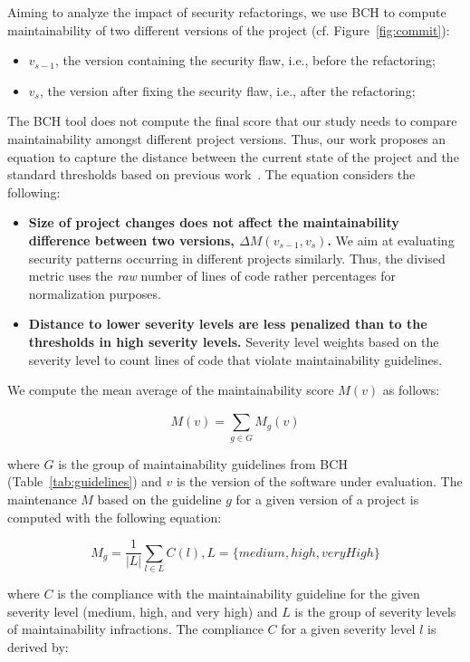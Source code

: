 \documentclass[10pt,conference]{IEEEtran}
\begin{document}
Aiming to analyze the impact of security refactorings, we use BCH to compute
maintainability of two different versions of the project (cf. Figure~\ref{fig:commit}):
\begin{itemize}
	\item $v_{s-1}$, the version containing the security flaw, i.e., before the
	refactoring;
	\item $v_{s}$, the version after fixing the security flaw, i.e., after the
	refactoring;
\end{itemize}

The BCH tool does not compute the final score that our study needs to compare
maintainability amongst different project versions. Thus, our work proposes an
equation to capture the distance between the current state of the project and
the standard thresholds based on previous work~\cite{Olivari:2018}. The equation
considers the following:
\begin{itemize}
	\item \textbf{Size of project changes does not affect the maintainability
	difference between two versions, $\Delta M (v_{s-1},v_{s})$.} We
	aim at evaluating security patterns occurring in different projects similarly.
	Thus, the divised metric uses the \textit{raw} number of lines of code rather
  percentages for normalization purposes.
	\item \textbf{Distance to lower severity levels are less penalized than to the
	thresholds in high severity levels.} Severity level weights based on the
	severity level to count lines of code that violate maintainability guidelines.
\end{itemize}

We compute the mean average of the maintainability score $M(v)$ as follows:

\begin{equation}
    M(v) = \sum_{g \in G}^{} M_{g}(v)
\end{equation}

\noindent
where $G$ is the group of maintainability guidelines from BCH
(Table~\ref{tab:guidelines}) and $v$ is the version of the software under
evaluation. The maintenance $M$ based on the guideline $g$ for a given version
of a project is computed with the following equation:

\begin{equation}
    M_{g} = \frac{1}{|L|} \sum_{l \in L}^{} C(l) , L = \{medium, high, veryHigh\}
\end{equation}

\noindent
where $C$ is the compliance with the maintainability guideline for the given
severity level (medium, high, and very high) and $L$ is the group of severity
levels of maintainability infractions. The compliance $C$ for a given severity
level $l$ is derived by:
\end{document}
